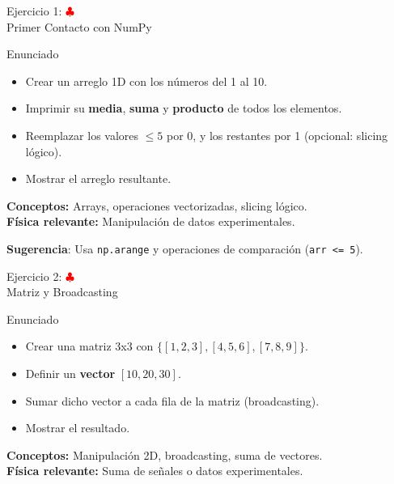 \documentclass[10pt]{beamer}
\begin{document}
\begin{frame}{Ejercicio 1: \hfill \textcolor{red}{$\clubsuit$} \\ Primer Contacto con NumPy}
  \begin{block}{Enunciado}
    \begin{itemize}
      \item Crear un arreglo 1D con los números del 1 al 10.
      \item Imprimir su \textbf{media}, \textbf{suma} y \textbf{producto} de todos los elementos.
      \item Reemplazar los valores $\leq 5$ por 0, y los restantes por 1 (opcional: slicing lógico).
      \item Mostrar el arreglo resultante.
    \end{itemize}
  \end{block}
  	\textbf{Conceptos:} Arrays, operaciones vectorizadas, slicing lógico.\\
  	\textbf{Física relevante:} Manipulación de datos experimentales.
  
  	\textbf{Sugerencia}: Usa \texttt{np.arange} y operaciones de comparación (\texttt{arr <= 5}).
\end{frame}

\begin{frame}{Ejercicio 2: \hfill \textcolor{red}{$\clubsuit$} \\ Matriz y Broadcasting}
  \begin{block}{Enunciado}
    \begin{itemize}
      \item Crear una matriz 3x3 con $\{[1,2,3],[4,5,6],[7,8,9]\}$.
      \item Definir un \textbf{vector} $[10, 20, 30]$.
      \item Sumar dicho vector a cada fila de la matriz (broadcasting).
      \item Mostrar el resultado.
    \end{itemize}
  \end{block}
  	\textbf{Conceptos:} Manipulación 2D, broadcasting, suma de vectores.\\
  	\textbf{Física relevante:} Suma de señales o datos experimentales.
\end{frame}
\end{document}
